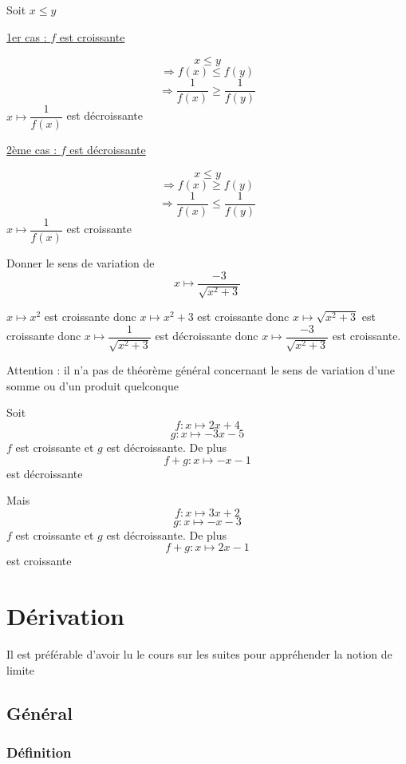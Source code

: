 \begin{preuve}
Soit $x \leq y$\newline

\underline{1er cas : $f$ est croissante}\newline

$$x \leq y$$
$$\Rightarrow f(x) \leq f(y)$$
$$\Rightarrow \dfrac{1}{f(x)} \geq \dfrac{1}{f(y)}$$
$x\mapsto \dfrac{1}{f(x)}$ est décroissante\newline

\underline{2ème cas : $f$ est décroissante}\newline

$$x \leq y$$
$$\Rightarrow f(x) \geq f(y)$$
$$\Rightarrow \dfrac{1}{f(x)} \leq \dfrac{1}{f(y)}$$
$x\mapsto \dfrac{1}{f(x)}$ est croissante
\end{preuve}
\begin{exemple}
Donner le sens de variation de 
$$x \mapsto \dfrac{-3}{\sqrt{x^2 + 3}}$$

$x\mapsto x^2$ est croissante donc $x\mapsto x^2+3$ est croissante donc $x\mapsto \sqrt{x^2+3}$ est croissante donc $x\mapsto \dfrac{1}{\sqrt{x^2+3}}$ est décroissante donc $x\mapsto \dfrac{-3}{\sqrt{x^2+3}}$ est croissante.
\end{exemple}

Attention : il n'a pas de théorème général concernant le sens de variation d'une somme ou d'un produit quelconque\newline

\begin{exemple}
Soit 
$$f : x\mapsto 2x+4$$
$$g:x\mapsto -3x-5$$
$f$ est croissante et $g$ est décroissante.
De plus $$f+g:x\mapsto -x-1$$ est décroissante\newline

Mais 
$$f : x\mapsto 3x+2$$
$$g:x\mapsto -x-3$$
$f$ est croissante et $g$ est décroissante.
De plus $$f+g:x\mapsto 2x-1$$ est croissante
\end{exemple}
\chapter{Dérivation}
Il est préférable d'avoir lu le cours sur les suites pour appréhender la notion de limite
\section{Général}
\subsection{Définition}
\newline

